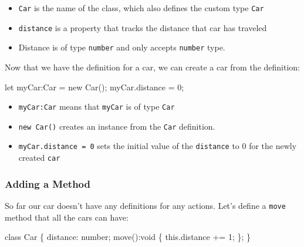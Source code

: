 \documentclass[12pt,]{article}
\newenvironment{Shaded}{}{}
\newcommand{\KeywordTok}[1]{\textcolor[rgb]{0.00,0.00,1.00}{{#1}}}
\newcommand{\DataTypeTok}[1]{{#1}}
\newcommand{\DecValTok}[1]{{#1}}
\newcommand{\FunctionTok}[1]{{#1}}
\newcommand{\NormalTok}[1]{{#1}}
\providecommand{\tightlist}{%
  \setlength{\itemsep}{0pt}\setlength{\parskip}{0pt}}
\begin{document}
\begin{itemize}
\tightlist
\item
  \texttt{Car} is the name of the class, which also defines the custom
  type \texttt{Car}
\item
  \texttt{distance} is a property that tracks the distance that car has
  traveled
\item
  Distance is of type \texttt{number} and only accepts \texttt{number}
  type.
\end{itemize}

Now that we have the definition for a car, we can create a car from the
definition:

\begin{Shaded}
\begin{Highlighting}[numbers=left,,]
\NormalTok{let myCar:Car = }\KeywordTok{new} \FunctionTok{Car}\NormalTok{();}
\NormalTok{myCar.}\FunctionTok{distance} \NormalTok{= }\DecValTok{0}\NormalTok{;}
\end{Highlighting}
\end{Shaded}

\begin{itemize}
\tightlist
\item
  \texttt{myCar:Car} means that \texttt{myCar} is of type \texttt{Car}
\item
  \texttt{new\ Car()} creates an instance from the \texttt{Car}
  definition.
\item
  \texttt{myCar.distance\ =\ 0} sets the initial value of the
  \texttt{distance} to 0 for the newly created \texttt{car}
\end{itemize}

\subsubsection{Adding a Method}\label{adding-a-method}

So far our car doesn't have any definitions for any actions. Let's
define a \texttt{move} method that all the cars can have:

\begin{Shaded}
\begin{Highlighting}[numbers=left,,]
\KeywordTok{class} \NormalTok{Car \{}
  \NormalTok{distance: number;}
  \FunctionTok{move}\NormalTok{():}\DataTypeTok{void} \NormalTok{\{}
    \KeywordTok{this}\NormalTok{.}\FunctionTok{distance} \NormalTok{+= }\DecValTok{1}\NormalTok{;}
  \NormalTok{\};}
\NormalTok{\}}
\end{Highlighting}
\end{Shaded}
\end{document}
